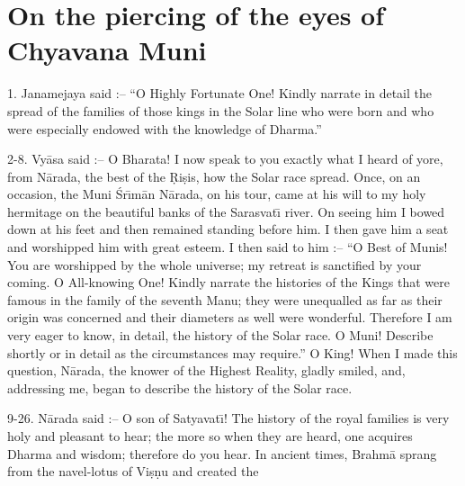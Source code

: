 \chapter{On the piercing of the eyes of Chyavana Muni}

1. Janamejaya said :-- ``O Highly Fortunate One! Kindly narrate in detail the spread of the families of those kings in the Solar line who were born and who were especially endowed with the knowledge of Dharma.''

2-8. Vy\=asa said :-- O Bharata! I now speak to you exactly what I heard of yore, from N\=arada, the best of the \d{R}i\d{s}is, how the Solar race spread. Once, on an occasion, the Muni \'Sr\={\i}m\=an N\=arada, on his tour, came at his will to my holy hermitage on the beautiful banks of the Sarasvat\={\i} river. On seeing him I bowed down at his feet and then remained standing before him. I then gave him a seat and worshipped him with great esteem. I then said to him :-- ``O Best of Munis! You are worshipped by the whole universe; my retreat is sanctified by your coming. O All-knowing One! Kindly narrate the histories of the Kings that were famous in the family of the seventh Manu; they were unequalled as far as their origin was concerned and their diameters as well were wonderful. Therefore I am very eager to know, in detail, the history of the Solar race. O Muni! Describe shortly or in detail as the circumstances may require.'' O King! When I made this question, N\=arada, the knower of the Highest Reality, gladly smiled, and, addressing me, began to describe the history of the Solar race.

9-26. N\=arada said :-- O son of Satyavat\={\i}! The history of the royal families is very holy and pleasant to hear; the more so when they are heard, one acquires Dharma and wisdom; therefore do you hear. In ancient times, Brahm\=a sprang from the navel-lotus of Vi\d{s}\d{n}u and created the

